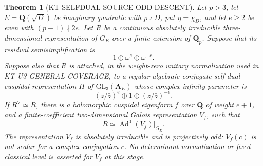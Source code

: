 \documentclass[11pt,a4paper]{article}
\newtheorem{theorem}{Theorem}[section]
\theoremstyle{definition}
\begin{document}
\begin{theorem}[KT-SELFDUAL-SOURCE-ODD-DESCENT]
Let $p>3$, let $E=\mathbf Q(\sqrt D)$ be imaginary quadratic with
$p\nmid D$, put $\eta=\chi_D$, and let $e\ge2$ be even with
$(p-1)\nmid2e$.
Let $R$ be a continuous absolutely irreducible three-dimensional
representation of $G_E$ over a finite extension of $\mathbf Q_p$.
Suppose that its residual semisimplification is
\[
                  1\oplus\omega^e\oplus\omega^{-e}.       \tag{SD.1}
\]
Suppose also that $R$ is attached, in the weight-zero unitary
normalization used in KT-U3-GENERAL-COVERAGE, to a regular algebraic
conjugate-self-dual cuspidal representation $\Pi$ of
$\mathrm{GL}_3(\mathbf A_E)$ whose complex infinity parameter is
\[
                 (z/\bar z)^e\oplus1\oplus(z/\bar z)^{-e}.
                                                               \tag{SD.2}
\]
If $R^\vee\simeq R$, there is a holomorphic cuspidal eigenform $f$
over $\mathbf Q$ of weight $e+1$, and a finite-coefficient
two-dimensional Galois representation $V_f$, such that
\[
              R\simeq\operatorname{Ad}^0(V_f)|_{G_E}.     \tag{SD.3}
\]
The representation $V_f$ is absolutely irreducible and is
projectively odd: $V_f(c)$ is not scalar for a complex conjugation
$c$.  No determinant normalization or fixed classical level is
asserted for $V_f$ at this stage.
\end{theorem}
\end{document}
